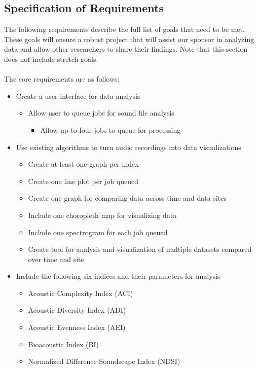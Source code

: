 \subsection{Specification of Requirements}
The following requirements describe the full list of goals that need to be met. These goals will ensure a robust project that will assist our sponsor in analyzing data and allow other researchers to share their findings. Note that this section does not include stretch goals.\\\\
The core requirements are as follows:
\begin{itemize}
  \item Create a user interface for data analysis
  \begin{itemize}
    \item Allow user to queue jobs for sound file analysis
    \begin{itemize}
      \item Allow up to four jobs to queue for processing
    \end{itemize}
  \end{itemize}
  \item Use existing algorithms to turn audio recordings into data visualizations
    \begin{itemize}
      \item Create at least one graph per index
      \item Create one line plot per job queued
      \item Create one graph for comparing data across time and data sites
      \item Include one choropleth map for visualizing data
      \item Include one spectrogram for each job queued
      \item Create tool for analysis and visualization of multiple datasets compared over time and site
    \end{itemize}
  \item Include the following six indices and their parameters for analysis
    \begin{itemize}
      \item Acoustic Complexity Index (ACI)
      \item Acoustic Diversity Index (ADI)
      \item Acoustic Evenness Index (AEI)
      \item Bioacoustic Index (BI)
      \item Normalized Difference Soundscape Index (NDSI)

\end{itemize}
\end{itemize}
